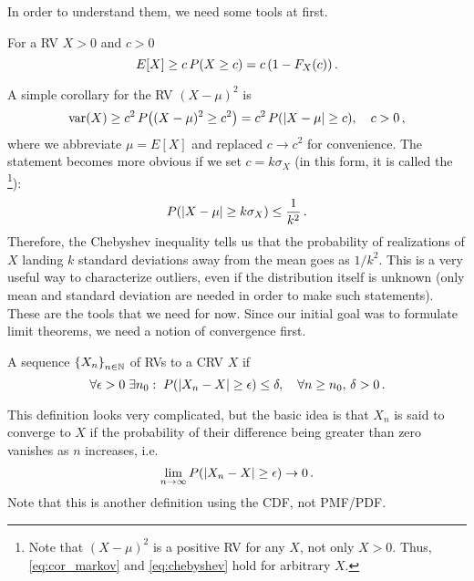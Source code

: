 In order to understand them, we need some tools at first.
\begin{prop}
For a RV $X > 0$ and $c > 0$
\begin{equation}
E[X] \geq c \, P\qty(X \geq c) = c \, (1 - F_X(c)) \, .
\end{equation}
\end{prop}
A simple corollary for the RV $(X - \mu)^2$ is
\begin{equation}\label{eq:cor_markov}
\operatorname{var}(X) \geq c^2 \, P\qty((X - \mu)^2 \geq c^2) = c^2 \, P\qty(\abs{X - \mu} \geq c), \quad c > 0 \, ,
\end{equation}
where we abbreviate $\mu = E[X]$ and replaced $c \rightarrow c^2$ for convenience. The statement becomes more obvious if we set $c = k \sigma_X$ (in this form, it is called the \footnote{Note that $(X - \mu)^2$ is a positive RV for any $X$, not only $X > 0$. Thus, \eqref{eq:cor_markov} and \eqref{eq:chebyshev} hold for arbitrary $X$.}):
\begin{equation}\label{eq:chebyshev}
P\qty(\abs{X - \mu} \geq k \sigma_X) \leq \frac{1}{k^2} \, .
\end{equation}
Therefore, the Chebyshev inequality tells us that the probability of realizations of $X$ landing $k$ standard deviations away from the mean goes as $1 / k^2$. This is a very useful way to characterize outliers, even if the distribution itself is unknown (only mean and standard deviation are needed in order to make such statements).\\


These are the tools that we need for now. Since our initial goal was to formulate limit theorems, we need a notion of convergence first.
\begin{defi}
A sequence $\qty{X_n}_{n \in \mathbb{N}}$ of RVs  to a CRV $X$ if
\begin{equation}
\forall \epsilon > 0 \; \exists n_0: \; P\qty(\abs{X_n - X} \geq \epsilon) \leq \delta, \quad \forall n \geq n_0, \, \delta > 0 \, .
\end{equation}
\end{defi}
This definition looks very complicated, but the basic idea is that $X_n$ is said to converge to $X$ if the probability of their difference being greater than zero vanishes as $n$ increases, i.e.
\begin{equation}
\lim_{n \rightarrow \infty} P\qty(\abs{X_n - X} \geq \epsilon) \rightarrow 0 \, .
\end{equation}
Note that this is another definition using the CDF, not PMF/PDF.


